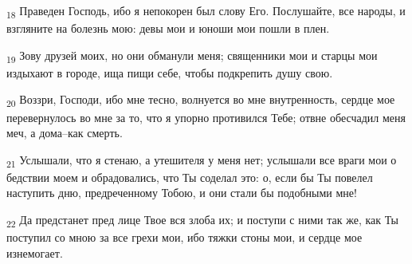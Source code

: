 \begin{tcolorbox}
\textsubscript{18} Праведен Господь, ибо я непокорен был слову Его. Послушайте, все народы, и взгляните на болезнь мою: девы мои и юноши мои пошли в плен.
\end{tcolorbox}
\begin{tcolorbox}
\textsubscript{19} Зову друзей моих, но они обманули меня; священники мои и старцы мои издыхают в городе, ища пищи себе, чтобы подкрепить душу свою.
\end{tcolorbox}
\begin{tcolorbox}
\textsubscript{20} Воззри, Господи, ибо мне тесно, волнуется во мне внутренность, сердце мое перевернулось во мне за то, что я упорно противился Тебе; отвне обесчадил меня меч, а дома--как смерть.
\end{tcolorbox}
\begin{tcolorbox}
\textsubscript{21} Услышали, что я стенаю, а утешителя у меня нет; услышали все враги мои о бедствии моем и обрадовались, что Ты соделал это: о, если бы Ты повелел наступить дню, предреченному Тобою, и они стали бы подобными мне!
\end{tcolorbox}
\begin{tcolorbox}
\textsubscript{22} Да предстанет пред лице Твое вся злоба их; и поступи с ними так же, как Ты поступил со мною за все грехи мои, ибо тяжки стоны мои, и сердце мое изнемогает.
\end{tcolorbox}
